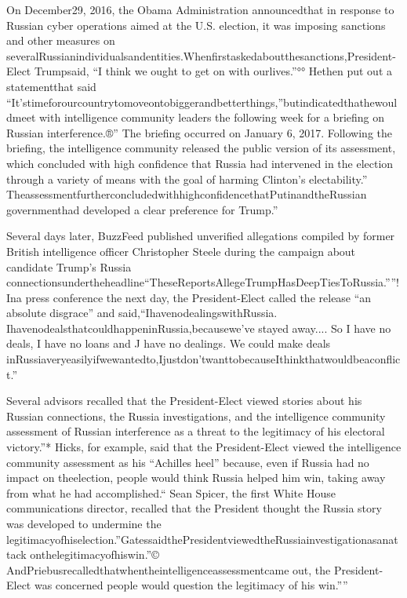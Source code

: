 On December29, 2016, the Obama Administration announcedthat in response to Russian cyber operations aimed at the U.S. election, it was imposing sanctions and other measures on severalRussianindividualsandentities.Whenfirstaskedaboutthesanctions,President-Elect Trumpsaid, “I think we ought to get on with ourlives.”°° Hethen put out a statementthat said “It’stimeforourcountrytomoveontobiggerandbetterthings,”butindicatedthathewouldmeet with intelligence community leaders the following week for a briefing on Russian interference.®” The briefing occurred on January 6, 2017. Following the briefing, the intelligence community released the public version of its assessment, which concluded with high confidence that Russia had intervened in the election through a variety of means with the goal of harming Clinton’s electability.” TheassessmentfurtherconcludedwithhighconfidencethatPutinandtheRussian governmenthad developed a clear preference for Trump.”

Several days later, BuzzFeed published unverified allegations compiled by former British intelligence officer Christopher Steele during the campaign about candidate Trump’s Russia connectionsundertheheadline“TheseReportsAllegeTrumpHasDeepTiesToRussia.””! Ina press conference the next day, the President-Elect called the release “an absolute disgrace” and said,“IhavenodealingswithRussia. IhavenodealsthatcouldhappeninRussia,becausewe’ve stayed away.... So I have no deals, I have no loans and J have no dealings. We could make deals inRussiaveryeasilyifwewantedto,Ijustdon’twanttobecauseIthinkthatwouldbeaconflict.”

Several advisors recalled that the President-Elect viewed stories about his Russian connections, the Russia investigations, and the intelligence community assessment of Russian interference as a threat to the legitimacy of his electoral victory.”* Hicks, for example, said that the President-Elect viewed the intelligence community assessment as his “Achilles heel” because, even if Russia had no impact on theelection, people would think Russia helped him win, taking away from what he had accomplished.“ Sean Spicer, the first White House communications director, recalled that the President thought the Russia story was developed to undermine the legitimacyofhiselection.”GatessaidthePresidentviewedtheRussiainvestigationasanattack onthelegitimacyofhiswin.”© AndPriebusrecalledthatwhentheintelligenceassessmentcame out, the President-Elect was concerned people would question the legitimacy of his win.””

